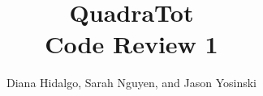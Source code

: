 \documentclass[11pt,letterpaper]{article}
\title{QuadraTot \\
{\normalsize \sc Code Review 1}}
\author{Diana Hidalgo, Sarah Nguyen,  and Jason Yosinski \\
\code{\{djh283,smn64,jy495\}@cornell.edu}}
\begin{document}
\maketitle
\normalem

%




\end{document}
